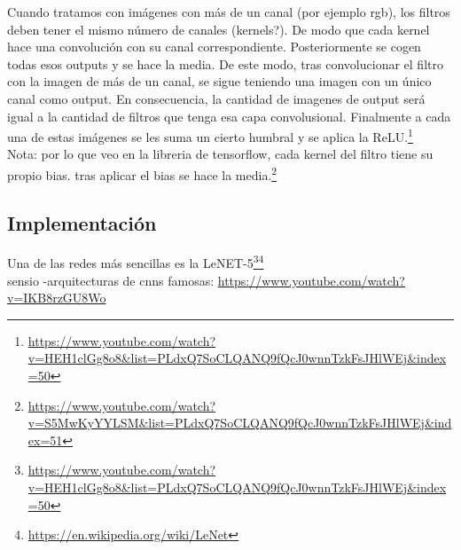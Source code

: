\documentclass{article}
\begin{document}
Cuando tratamos con imágenes con más de un canal (por ejemplo rgb), los filtros deben tener el  mismo número de canales (kernels?). De modo que cada kernel  hace una convolución con su canal correspondiente. Posteriormente se cogen todas esos outputs y se hace la media. De este modo, tras convolucionar el filtro con la imagen de más de un canal, se sigue teniendo una imagen con un único canal como output. En consecuencia, la cantidad de imagenes de output será igual a la cantidad de filtros que tenga esa capa convolusional. Finalmente a cada una de estas imágenes se les suma un cierto humbral y se aplica la ReLU.\footnote{\url{https://www.youtube.com/watch?v=HEH1clGg8o8&list=PLdxQ7SoCLQANQ9fQcJ0wnnTzkFsJHlWEj&index=50}}\\

Nota: por lo que veo en la libreria de tensorflow, cada kernel del filtro tiene su propio bias. tras aplicar el bias se hace la media.\footnote{\url{https://www.youtube.com/watch?v=S5MwKyYYLSM&list=PLdxQ7SoCLQANQ9fQcJ0wnnTzkFsJHlWEj&index=51}}

\subsection{Implementación}
Una de las redes más sencillas es la LeNET-5\footnote{\url{https://www.youtube.com/watch?v=HEH1clGg8o8&list=PLdxQ7SoCLQANQ9fQcJ0wnnTzkFsJHlWEj&index=50}}\footnote{\url{https://en.wikipedia.org/wiki/LeNet}}\\

sensio -arquitecturas de cnns famosas: \url{https://www.youtube.com/watch?v=IKB8rzGU8Wo}
\end{document}
